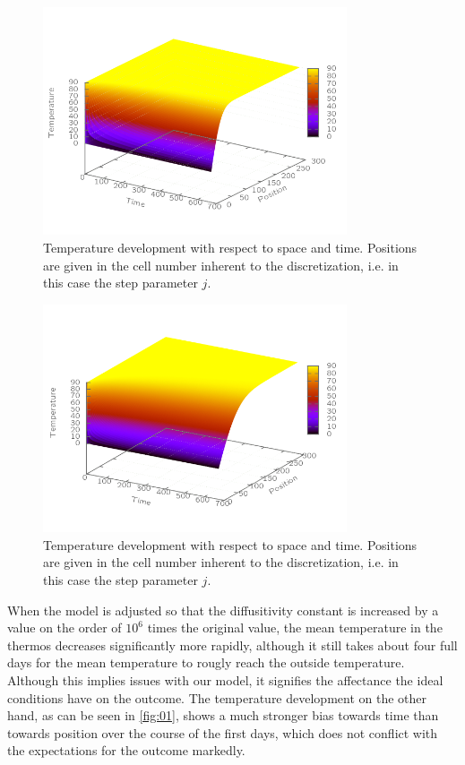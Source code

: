\documentclass[a4paper,12pt]{article}
\theoremstyle{plain}
\theoremstyle{definition}
\begin{document}
   \begin{figure}[H]
      \centering
      \includegraphics[width=0.8\textwidth]{../script/testout.png}
      \caption{Temperature development with respect to space and time. Positions
      are given in the cell number inherent to the discretization, i.e. in this
      case the step parameter $j$.}
      \label{fig:normal}
   \end{figure}       
   \begin{figure}[H]
      \centering
      \includegraphics[width=0.8\textwidth]{../test.png}
      \caption{Temperature development with respect to space and time. Positions
      are given in the cell number inherent to the discretization, i.e. in this
      case the step parameter $j$.}
      \label{fig:new}
   \end{figure}       
   
   When the model is adjusted so that the diffusitivity constant is increased by
   a value on the order of $10^6$ times the original value, the mean
   temperature in the thermos decreases significantly more rapidly, although it
   still takes about four full days for the mean temperature to rougly reach the
   outside temperature. Although this implies issues with our model, it
   signifies the affectance the ideal conditions have on the outcome. The
   temperature development on the other hand, as can be seen in \cref{fig:01},
   shows a much stronger bias towards time than towards position over the course
   of the first days, which does not conflict with the expectations for the
   outcome markedly.
\end{document}
